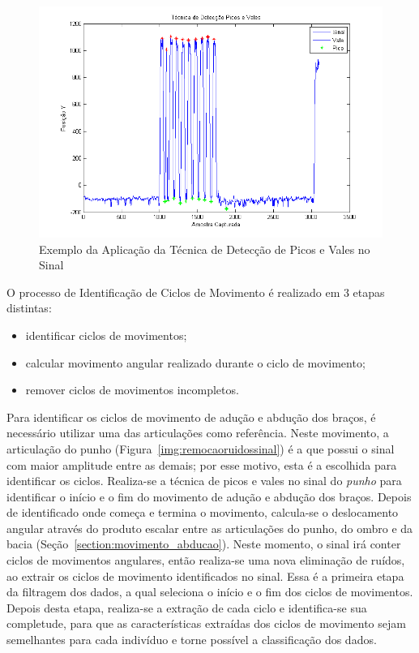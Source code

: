 \begin{figure}[!htb]
     \centering
     \includegraphics[width=1\textwidth]{./img/deteccaopicosvales.png}
     \caption{Exemplo da Aplicação da Técnica de Detecção de Picos e Vales no Sinal}
     \label{img:expicosvales}
\end{figure}


O processo de Identificação de Ciclos de Movimento é realizado em 3 etapas distintas:
\begin{itemize}
	\item identificar ciclos de movimentos;
	\item calcular movimento angular realizado durante o ciclo de movimento;
	\item remover ciclos de movimentos incompletos.
\end{itemize}

Para identificar os ciclos de movimento de adução e abdução dos braços, é necessário utilizar uma das articulações como referência. Neste movimento, a articulação do punho (Figura~\ref{img:remocaoruidossinal}) é a que possui o sinal com maior amplitude entre as demais; por esse motivo, esta é a escolhida para identificar os ciclos. Realiza-se a técnica de picos e vales no sinal do \textit{punho} para identificar o início e o fim do movimento de adução e abdução dos braços. Depois de identificado onde começa e termina o movimento, calcula-se o deslocamento angular através do produto escalar entre as articulações do punho, do ombro e da bacia (Seção~\ref{section:movimento_abducao}). Neste momento, o sinal irá conter ciclos de movimentos angulares, então realiza-se uma nova eliminação de ruídos, ao extrair os ciclos de movimento identificados no sinal. Essa é a primeira etapa da filtragem dos dados, a qual seleciona o início e o fim dos ciclos de movimentos. Depois desta etapa, realiza-se a extração de cada ciclo e 
identifica-se sua completude, para que as características extraídas dos ciclos de movimento sejam semelhantes para cada indivíduo e torne possível a classificação dos dados.

